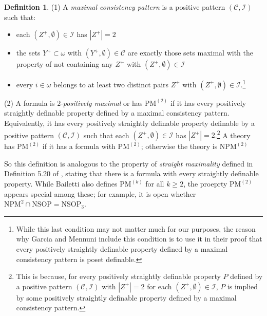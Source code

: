 \documentclass{article}
\theoremstyle{definition}
\newtheorem{definition}{Definition}
\theoremstyle{definition}
\theoremstyle{definition}
\begin{document}
\begin{definition}

(1) A \textit{maximal consistency pattern} is a positive pattern $(\mathcal{C}, \mathcal{I})$ such that:

\begin{itemize}
    \item each $(Z^{+}, \emptyset) \in \mathcal{I}$ has $|Z^{+}|=2$
    \item the sets $Y^{+} \subset \omega$ with $(Y^{+}, \emptyset) \in \mathcal{C}$ are exactly those sets maximal with the property of not containing any $Z^{+}$ with  $(Z^{+}, \emptyset) \in \mathcal{I}$
    \item every $i \in \omega$ belongs to at least two distinct pairs $Z^{+}$ with $(Z^{+}, \emptyset) \in \mathcal{I}$.\footnote{While this last condition may not matter much for our purposes, the reason why Garcia and Mennuni include this condition is to use it in their proof that every positively straightly definable property defined by a maximal consistency pattern is poset definable.}
\end{itemize}





(2) A formula is $2$-\textit{positively maximal} or has $\mathrm{PM}^{(2)}$ if it has every positively straightly definable property defined by a maximal consistency pattern. Equivalently, it has every positively straightly definable property definable by a positive pattern $(\mathcal{C}, \mathcal{I})$ such that each $(Z^{+}, \emptyset) \in \mathcal{I}$ has $|Z^{+}|=2$.\footnote{This is because, for every positively straightly definable property $P$ defined by a positive pattern $(\mathcal{C}, \mathcal{I})$ with $|Z^{+}|=2$ for each $(Z^{+}, \emptyset) \in \mathcal{I}$, $P$ is implied by some positively straightly definable property defined by a maximal consistency pattern.} A theory has $\mathrm{PM}^{(2)}$ if it has a formula with $\mathrm{PM}^{(2)}$; otherwise the theory is $\mathrm{NPM}^{(2)}$
    
\end{definition}


So this definition is analogous to the property of \textit{straight maximality} defined in Definition 5.20 of \cite{shelah_what_2000}, stating that there is a formula with every straightly definable property.  While Bailetti also defines $\mathrm{PM}^{(k)}$ for all $k \geq 2$, the proeprty $\mathrm{PM}^{(2)}$ appears special among these; for example, it is open whether $\mathrm{NPM}^{2} \cap \mathrm{NSOP} = \mathrm{NSOP}_{3}$.
\end{document}
